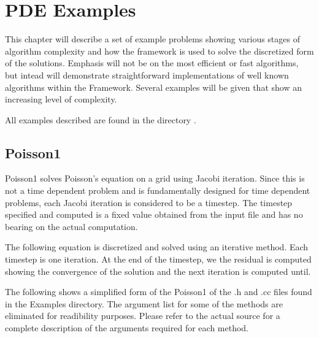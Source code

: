 \chapter{PDE Examples}

This chapter will describe a set of example problems showing various
stages of algorithm complexity and how the \Vaango framework is used to
solve the discretized form of the solutions.  Emphasis will not be on
the most efficient or fast algorithms, but intead will demonstrate
straightforward implementations of well known algorithms within the
\Vaango Framework.  Several examples will be given that show an
increasing level of complexity.

All examples described are found in the directory
.

\section{Poisson1}

Poisson1 solves Poisson's equation on a grid using Jacobi
iteration.  Since this is not a time dependent problem and \Vaango is
fundamentally designed for time dependent problems, each Jacobi
iteration is considered to be a timestep.  The timestep specified and
computed is a fixed value obtained from the input file and has no
bearing on the actual computation.

The following equation is discretized and solved using an iterative
method. Each timestep is one iteration. At the end of the timestep, we
the residual is computed showing the convergence of the solution and
the next iteration is computed until.

The following shows a simplified form of the Poisson1 of the .h and
.cc files found in the Examples directory.  The argument list for some
of the methods are eliminated for readibility purposes.  Please refer
to the actual source for a complete description of the arguments
required for each method.

